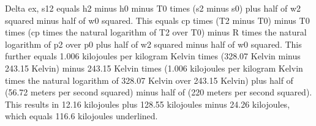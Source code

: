 Delta ex, s12 equals h2 minus h0 minus T0 times (s2 minus s0) plus half of w2 squared minus half of w0 squared. This equals cp times (T2 minus T0) minus T0 times (cp times the natural logarithm of T2 over T0) minus R times the natural logarithm of p2 over p0 plus half of w2 squared minus half of w0 squared. This further equals 1.006 kilojoules per kilogram Kelvin times (328.07 Kelvin minus 243.15 Kelvin) minus 243.15 Kelvin times (1.006 kilojoules per kilogram Kelvin times the natural logarithm of 328.07 Kelvin over 243.15 Kelvin) plus half of (56.72 meters per second squared) minus half of (220 meters per second squared). This results in 12.16 kilojoules plus 128.55 kilojoules minus 24.26 kilojoules, which equals 116.6 kilojoules underlined.